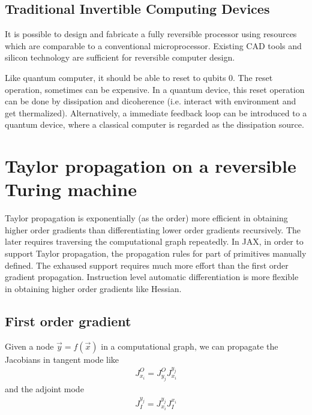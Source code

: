 \documentclass[aps,twocolumn,longbibliography,english,superscriptaddress,prr]{revtex4-1}
\newcommand{\<}{\langle}
\renewcommand{\>}{\rangle}
\newcommand{\out}{{O}}
\newcommand{\inp}{{I}}
\theoremstyle{definition}\newtheorem{definition}{\textit{Definition}}
\begin{document}
\subsection{Traditional Invertible Computing Devices}
It is possible to design and fabricate a fully reversible processor using resources which are comparable to a conventional microprocessor. Existing CAD tools and silicon technology are sufficient for reversible computer design.

Like quantum computer, it should be able to reset to qubits $0$. The reset operation, sometimes can be expensive. In a quantum device, this reset operation can be done by dissipation and dicoherence (i.e. interact with environment and get thermalized). Alternatively, a immediate feedback loop can be introduced to a quantum device, where a classical computer is regarded as the dissipation source.


\section{Taylor propagation on a reversible Turing machine}\label{sec:bp}
Taylor propagation is exponentially (as the order) more efficient in obtaining higher order gradients than differentiating lower order gradients recursively.
The later requires traversing the computational graph repeatedly.
In JAX, in order to support Taylor propagation, the propagation rules for part of primitives manually defined.
The exhaused support requires much more effort than the first order gradient propagation.
Instruction level automatic differentiation is more flexible in obtaining higher order gradients like Hessian.

\subsection{First order gradient}\label{sec:jacobian}
Given a node $\vec y = f(\vec x)$ in a computational graph, we can propagate the Jacobians in tangent mode like
\begin{align}
    J^\out_{x_i} = J^\out_{y_j} J^{y_j}_{x_i}
\end{align}
and the adjoint mode
\begin{align}
    J^{y_j}_\inp = J^{y_j}_{x_i} J_\inp^{x_i}
\end{align}
\end{document}
